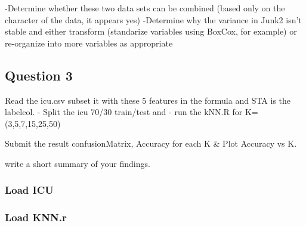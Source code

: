 \documentclass[]{article}
\newenvironment{Shaded}{\begin{snugshade}}{\end{snugshade}}
\newcommand{\KeywordTok}[1]{\textcolor[rgb]{0.13,0.29,0.53}{\textbf{#1}}}
\newcommand{\DataTypeTok}[1]{\textcolor[rgb]{0.13,0.29,0.53}{#1}}
\newcommand{\DecValTok}[1]{\textcolor[rgb]{0.00,0.00,0.81}{#1}}
\newcommand{\StringTok}[1]{\textcolor[rgb]{0.31,0.60,0.02}{#1}}
\newcommand{\CommentTok}[1]{\textcolor[rgb]{0.56,0.35,0.01}{\textit{#1}}}
\newcommand{\OperatorTok}[1]{\textcolor[rgb]{0.81,0.36,0.00}{\textbf{#1}}}
\newcommand{\NormalTok}[1]{#1}
\begin{document}
-Determine whether these two data sets can be combined (based only on
the character of the data, it appears yes) -Determine why the variance
in Junk2 isn't stable and either transform (standarize variables using
BoxCox, for example) or re-organize into more variables as appropriate

\subsection{Question 3}\label{question-3}

Read the icu.csv subset it with these 5 features in the formula and STA
is the labelcol. - Split the icu 70/30 train/test and - run the kNN.R
for K=(3,5,7,15,25,50)

Submit the result confusionMatrix, Accuracy for each K \& Plot Accuracy
vs K.

write a short summary of your findings.

\subsubsection{Load ICU}\label{load-icu}

\begin{Shaded}
\end{Shaded}

\subsubsection{Load KNN.r}\label{load-knn.r}
\end{document}
